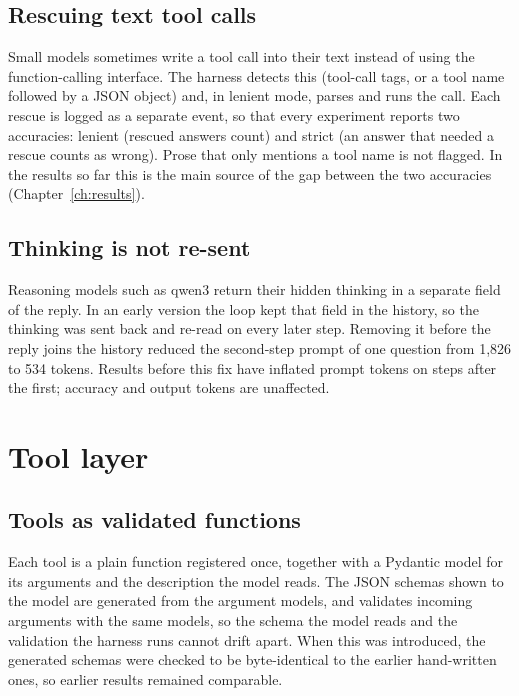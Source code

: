 \subsection{Rescuing text tool calls}

Small models sometimes write a tool call into their text instead of using the function-calling interface. The
harness detects this (tool-call tags, or a tool name followed by a JSON object) and, in lenient mode, parses and runs
the call. Each rescue is logged as a separate event, so that every experiment reports two accuracies: lenient (rescued
answers count) and strict (an answer that needed a rescue counts as wrong). Prose that only mentions a tool name is not
flagged. In the results so far this is the main source of the gap between the two accuracies
(Chapter~\ref{ch:results}).

\subsection{Thinking is not re-sent}

Reasoning models such as qwen3 return their hidden thinking in a separate field of the reply. In an early version the
loop kept that field in the history, so the thinking was sent back and re-read on every later step. Removing it before
the reply joins the history reduced the second-step prompt of one question from 1,826 to 534 tokens. Results before
this fix have inflated prompt tokens on steps after the first; accuracy and output tokens are unaffected.

\section{Tool layer}

\subsection{Tools as validated functions}

Each tool is a plain function  registered once, together with a Pydantic model for
its arguments and the description the model reads. The JSON schemas shown to the model are generated from the
argument models, and  validates incoming arguments with the same models, so the schema the model reads
and the validation the harness runs cannot drift apart. When this was introduced, the generated schemas were checked to
be byte-identical to the earlier hand-written ones, so earlier results remained comparable.

